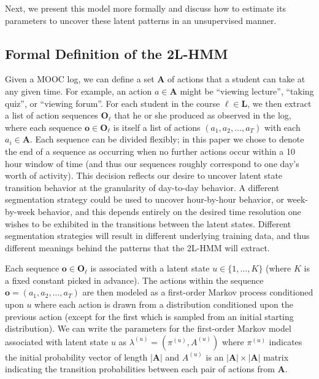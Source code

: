 Next, we present this model more formally and discuss how to
estimate its parameters to uncover these latent patterns in an unsupervised
manner.

\subsection{Formal Definition of the 2L-HMM}

Given a MOOC log, we can define a set $\mathbf{A}$ of actions that a
student can take at any given time. For example, an action $a \in
\mathbf{A}$ might be ``viewing lecture'', ``taking quiz'', or ``viewing
forum''. For each student in the course $\ell \in \mathbf{L}$, we then
extract a list of action sequences $\mathbf{O}_\ell$ that he or she
produced as observed in the log, where each sequence $\mathbf{o} \in
\mathbf{O}_\ell$ is itself a list of actions $(a_1, a_2, \ldots, a_T)$ with
each $a_i \in \mathbf{A}$.  Each sequence can be divided flexibly; in this
paper we chose to denote the end of a sequence as occurring when no further
actions occur within a 10 hour window of time (and thus our sequences
roughly correspond to one day's worth of activity). This decision reflects
our desire to uncover latent state transition behavior at the granularity
of day-to-day behavior. A different segmentation strategy could be used to
uncover hour-by-hour behavior, or week-by-week behavior, and this depends
entirely on the desired time resolution one wishes to be exhibited in the
transitions between the latent states. Different segmentation strategies
will result in different underlying training data, and thus different
meanings behind the patterns that the 2L-HMM will extract.

Each sequence $\mathbf{o} \in \mathbf{O}_\ell$ is associated with a latent
state $u \in \{1,\ldots,K\}$ (where $K$ is a fixed constant picked in
advance). The actions within the sequence $\mathbf{o} = (a_1, a_2, \ldots,
a_T)$ are then modeled as a first-order Markov process conditioned upon $u$
where each action is drawn from a distribution conditioned upon the
previous action (except for the first which is sampled from an initial
starting distribution). We can write the parameters for the first-order
Markov model associated with latent state $u$ as $\lambda^{(u)} =
(\pi^{(u)}, A^{(u)})$ where $\pi^{(u)}$ indicates the initial probability
vector of length $|\mathbf{A}|$ and $A^{(u)}$ is an $|\mathbf{A}| \times
|\mathbf{A}|$ matrix indicating the transition probabilities between each
pair of actions from $\mathbf{A}$.

